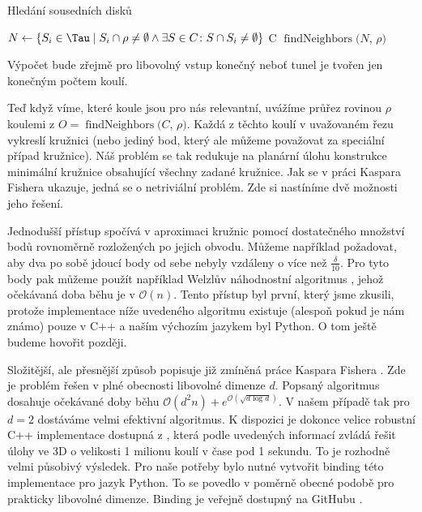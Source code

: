 \begin{algorithm}
\caption{Hledání sousedních disků}
\label{alg:findNeighbors}
\begin{algorithmic}[1]

    \State $ N \gets \{ S_i \in \Tau \mid S_i \cap \rho \neq \emptyset
        \wedge \exists S \in C \colon S \cap S_i \neq \emptyset \} $
        \State \Return C
    \Else
        \State \Return $\operatorname{findNeighbors}(N$, $\rho)$
    \EndIf
\EndFunction

\end{algorithmic}
\end{algorithm}

Výpočet bude zřejmě pro libovolný vstup konečný neboť tunel je tvořen jen konečným
počtem koulí.

Teď když víme, které koule jsou pro nás relevantní, uvážíme průřez rovinou
$ \rho $ koulemi z $ O = \operatorname{findNeighbors}(C$, $\rho)$.
Každá z těchto koulí v uvažovaném řezu vykreslí
kružnici (nebo jediný bod, který ale můžeme považovat za speciální případ kružnice).
Náš problém se tak redukuje na planární úlohu konstrukce minimální kružnice obsahující
všechny zadané kružnice. Jak se v práci Kaspara Fishera \cite{FisherBalls} ukazuje,
jedná se o netriviální problém. Zde si nastíníme dvě možnosti jeho řešení.

Jednodušší přístup spočívá v aproximaci kružnic pomocí dostatečného množství bodů
rovnoměrně rozložených po jejich obvodu. Můžeme například požadovat, aby dva
po sobě jdoucí body od sebe nebyly vzdáleny o více než $ \frac{\delta}{10} $.
Pro tyto body pak můžeme použít například Welzlův náhodnostní algoritmus
\cite{WelzlRandom}, jehož očekávaná doba běhu je v $ \mathcal{O}(n) $. Tento
přístup byl první, který jsme zkusili, protože implementace níže uvedeného algoritmu
existuje (alespoň pokud je nám známo) pouze v C++ a naším výchozím jazykem byl
Python. O tom ještě budeme hovořit později.

Složitější, ale přesnější způsob popisuje již zmíněná práce Kaspara Fishera
\cite{FisherBalls}. Zde je problém řešen v plné obecnosti libovolné dimenze $ d $.
Popsaný algoritmus dosahuje očekávané doby běhu
$ \mathcal{O}(d^2n) + e^{\mathcal{O}(\sqrt{d \log{d}})} $. V našem případě tak pro
$ d = 2 $ dostáváme velmi efektivní algoritmus. K dispozici je dokonce velice
robustní C++ implementace dostupná z \cite{cpp_balls}, která podle uvedených informací
zvládá řešit úlohy ve 3D o velikosti 1 milionu koulí v čase pod 1 sekundu. To
je rozhodně velmi působivý výsledek. Pro naše potřeby bylo nutné vytvořit
binding této implementace pro jazyk Python. To se povedlo v poměrně obecné
podobě pro prakticky libovolné dimenze. Binding je veřejně dostupný na GitHubu
\cite{python_balls}.

